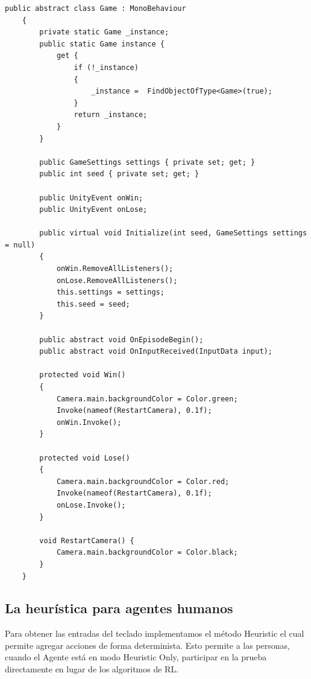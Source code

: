 \begin{lstlisting}[caption={Implementación de la clase Game base para todos los juegos de UTHOPIA}]
    public abstract class Game : MonoBehaviour
    {
        private static Game _instance;
        public static Game instance {
            get {
                if (!_instance)
                {
                    _instance =  FindObjectOfType<Game>(true);
                }
                return _instance;
            }
        }
 
        public GameSettings settings { private set; get; }
        public int seed { private set; get; }
 
        public UnityEvent onWin;
        public UnityEvent onLose;
 
        public virtual void Initialize(int seed, GameSettings settings = null)
        {
            onWin.RemoveAllListeners();
            onLose.RemoveAllListeners();
            this.settings = settings;
            this.seed = seed;
        }
 
        public abstract void OnEpisodeBegin();
        public abstract void OnInputReceived(InputData input);
 
        protected void Win()
        {
            Camera.main.backgroundColor = Color.green;
            Invoke(nameof(RestartCamera), 0.1f);
            onWin.Invoke();
        }
 
        protected void Lose()
        {
            Camera.main.backgroundColor = Color.red;
            Invoke(nameof(RestartCamera), 0.1f);
            onLose.Invoke();
        }
 
        void RestartCamera() {
            Camera.main.backgroundColor = Color.black;
        }
    }
\end{lstlisting}
 
\subsection{La heurística para agentes humanos}
 
Para obtener las entradas del teclado implementamos el método Heuristic el cual permite agregar acciones de forma determinista. Esto permite a las personas, cuando el Agente está en modo Heuristic Only, participar en la prueba directamente en lugar de los algoritmos de RL.
 
\vspace*{1cm}
 
